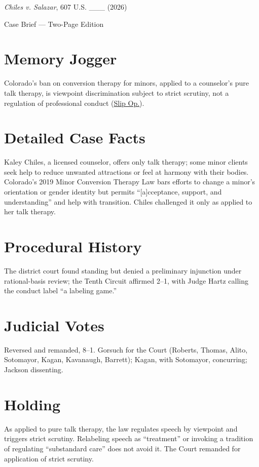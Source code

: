 \documentclass[12pt]{article}
\begin{document}
\begin{center}
{\LARGE \textit{Chiles v. Salazar}, 607 U.S. \_\_\_ (2026)\par}
\vspace{0.5em}
{\large Case Brief --- Two-Page Edition\par}
\end{center}

\section{Memory Jogger}
Colorado's ban on conversion therapy for minors, applied to a counselor's pure talk therapy, is viewpoint discrimination subject to strict scrutiny, not a regulation of professional conduct (\href{https://www.supremecourt.gov/opinions/25pdf/24-539_fd9g.pdf}{Slip Op.}).

\section{Detailed Case Facts}
Kaley Chiles, a licensed counselor, offers only talk therapy; some minor clients seek help to reduce unwanted attractions or feel at harmony with their bodies. Colorado's 2019 Minor Conversion Therapy Law bars efforts to change a minor's orientation or gender identity but permits ``[a]cceptance, support, and understanding'' and help with transition. Chiles challenged it only as applied to her talk therapy.

\section{Procedural History}
The district court found standing but denied a preliminary injunction under rational-basis review; the Tenth Circuit affirmed 2--1, with Judge Hartz calling the conduct label ``a labeling game.''

\section{Judicial Votes}
Reversed and remanded, 8--1. Gorsuch for the Court (Roberts, Thomas, Alito, Sotomayor, Kagan, Kavanaugh, Barrett); Kagan, with Sotomayor, concurring; Jackson dissenting.

\section{Holding}
As applied to pure talk therapy, the law regulates speech by viewpoint and triggers strict scrutiny. Relabeling speech as ``treatment'' or invoking a tradition of regulating ``substandard care'' does not avoid it. The Court remanded for application of strict scrutiny.
\end{document}

